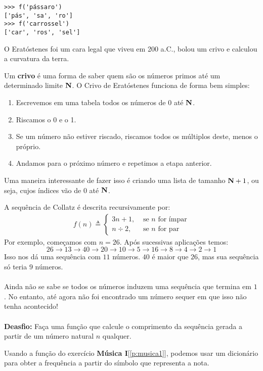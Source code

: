 \documentclass[12pt]{article}
\begin{document}
	\begin{lstlisting}[caption="Separando sílabas"]
>>> f('pássaro')
['pás', 'sa', 'ro']
>>> f('carrossel')
['car', 'ros', 'sel']
	\end{lstlisting}
	
	
	
	
	O Eratóstenes foi um cara legal que viveu em 200 a.C., bolou um crivo e calculou a curvatura da terra.
	
	
	Um \textbf{crivo} é uma forma de saber quem são os números primos até um determinado limite $\mathbf{N}$. O Crivo de Eratóstenes funciona de forma bem simples:
	
	\begin{enumerate}
		\item Escrevemos em uma tabela todos os números de 0 até $\mathbf{N}$.
		\item Riscamos o 0 e o 1.
		
		\item Se um número não estiver riscado, riscamos todos os múltiplos deste, menos o próprio.
		
		\item Andamos para o próximo número e repetimos a etapa anterior.		
	\end{enumerate}
	
	Uma maneira interessante de fazer isso é criando uma lista de tamanho $\mathbf{N} + 1$, ou seja, cujos índices vão de 0 até $\mathbf{N}$.
	
	
	
	
	
	
	A sequência de Collatz é descrita recursivamente por:
	{\large
	\begin{align*}
		f(n) \triangleq \begin{cases}
		3n + 1, &\text{ se } n \text{ for ímpar}\\
		n \div 2, &\text{ se } n \text{ for par}
		\end{cases}
	\end{align*}
	}
	Por exemplo, começamos com $n = 26$. Após sucessivas aplicações temos:
		$$26 \to 13 \to 40 \to 20 \to 10 \to 5 \to 16 \to 8 \to 4 \to 2 \to 1$$
	Isso nos dá uma sequência com $11$ números. $40$ é maior que $26$, mas sua sequência só teria $9$ números.\\
	\\
	Ainda não se sabe se todos os números induzem uma sequência que termina em $1$. No entanto, até agora não foi encontrado um número sequer em que isso não tenha acontecido!\\
	\\
	\textbf{Deasfio: } Faça uma função que calcule o comprimento da sequência gerada a partir de um número natural $n$ qualquer.
	
	\label{p:musica2}
	
	Usando a função do exercício \textbf{Música I}[\ref{p:musica1}], podemos usar um dicionário para obter a frequência a partir do símbolo que representa a nota.
	
	
	
\end{document}
